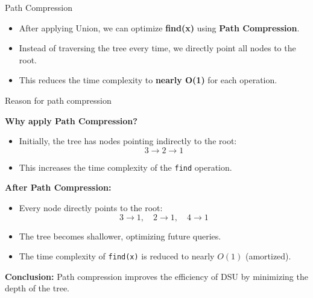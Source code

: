 \begin{frame}{Path Compression}
    \begin{itemize}
        \item After applying Union, we can optimize \textbf{find(x)} using \textbf{Path Compression}.
        \item Instead of traversing the tree every time, we directly point all nodes to the root.
        \item This reduces the time complexity to \textbf{nearly O(1)} for each operation.
    \end{itemize}

    \vspace{0.5cm}
    \centering

\end{frame}



\begin{frame}{Reason for path compression}

\textbf{Why apply Path Compression?}

\begin{itemize}
    \item Initially, the tree has nodes pointing indirectly to the root:
    \[
    3 \to 2 \to 1
    \]
    \item This increases the time complexity of the \texttt{find} operation.
\end{itemize}

\textbf{After Path Compression:}
\begin{itemize}
    \item Every node directly points to the root:
    \[
    3 \to 1, \quad 2 \to 1, \quad 4 \to 1
    \]
    \item The tree becomes shallower, optimizing future queries.
    \item The time complexity of \texttt{find(x)} is reduced to nearly \( O(1) \) (amortized).
\end{itemize}

\textbf{Conclusion:}  
Path compression improves the efficiency of DSU by minimizing the depth of the tree.

\end{frame}



